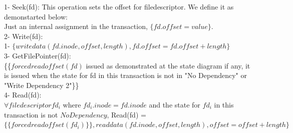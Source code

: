 \documentclass[a4paper, 11pt]{article}
\begin{document}
1- Seek(fd): This operation sets the offset for filedescriptor. We define it as demonstarted below:\\

\hspace{8mm} Just an internal assignment in the transaction, $\{{fd.offset = value}\}$.\\  


2- Write(fd):\\

\hspace{8mm} 1- $\{writedata(fd.inode, offset, length), fd.offset = fd.offset + length\}$\\

3- GetFilePointer(fd):\\

\hspace{8mm} \{\{$forcedreadoffset(fd)$ issued as demonstrated at the state diagram if any, it is issued when the state for fd in this transaction is not in "No Dependency" or "Write Dependency 2"\}\}\\

4- Read(fd):\\

\hspace{8mm} $\forall filedescriptor fd_i$ where $fd_i.inode = fd.inode$ and the state for $fd_i$ in this transaction is not $No Dependency$, Read(fd) =$\{\{forcedreadoffset(fd_i)\}\}, {readdata(fd.inode, offset, length)}, offset = offset + length\}$\\





\end{document}
